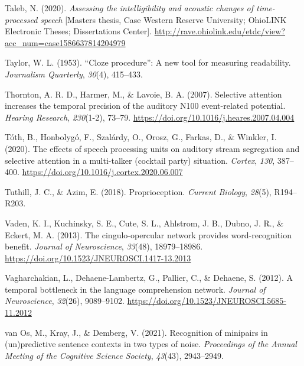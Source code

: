 \documentclass[a4paper, nobind]{templates/ociamthesis}
\newlength{\cslhangindent}
\newenvironment{CSLReferences}[2] %
 {%
  \setlength{\parindent}{0pt}
  \ifodd #1
  \let\oldpar\par
  \def\par{\hangindent=\cslhangindent\oldpar}
  \fi
  \setlength{\parskip}{1mm}
  \setlength{\baselineskip}{6mm}
 }%
 {}
\begin{document}
\begin{CSLReferences}{1}{0}
\leavevmode{}%
Taleb, N. (2020). \emph{Assessing the intelligibility and acoustic changes of time-processed speech} {[}Masters thesis, Case Western Reserve University; OhioLINK Electronic Theses; Dissertations Center{]}. \url{http://rave.ohiolink.edu/etdc/view?acc_num=case1586637814204979}

\leavevmode{}%
Taylor, W. L. (1953). {``Cloze procedure''}: A new tool for measuring readability. \emph{Journalism Quarterly}, \emph{30}(4), 415--433.

\leavevmode{}%
Thornton, A. R. D., Harmer, M., \& Lavoie, B. A. (2007). {Selective attention increases the temporal precision of the auditory N100 event-related potential}. \emph{Hearing Research}, \emph{230}(1-2), 73--79. \url{https://doi.org/10.1016/j.heares.2007.04.004}

\leavevmode{}%
Tóth, B., Honbolygó, F., Szalárdy, O., Orosz, G., Farkas, D., \& Winkler, I. (2020). {The effects of speech processing units on auditory stream segregation and selective attention in a multi-talker (cocktail party) situation}. \emph{Cortex}, \emph{130}, 387--400. \url{https://doi.org/10.1016/j.cortex.2020.06.007}

\leavevmode{}%
Tuthill, J. C., \& Azim, E. (2018). Proprioception. \emph{Current Biology}, \emph{28}(5), R194--R203.

\leavevmode{}%
Vaden, K. I., Kuchinsky, S. E., Cute, S. L., Ahlstrom, J. B., Dubno, J. R., \& Eckert, M. A. (2013). {The cingulo-opercular network provides word-recognition benefit}. \emph{Journal of Neuroscience}, \emph{33}(48), 18979--18986. \url{https://doi.org/10.1523/JNEUROSCI.1417-13.2013}

\leavevmode{}%
Vagharchakian, L., Dehaene-Lambertz, G., Pallier, C., \& Dehaene, S. (2012). {A temporal bottleneck in the language comprehension network}. \emph{Journal of Neuroscience}, \emph{32}(26), 9089--9102. \url{https://doi.org/10.1523/JNEUROSCI.5685-11.2012}

\leavevmode{}%
van Os, M., Kray, J., \& Demberg, V. (2021). {Recognition of minipairs in (un)predictive sentence contexts in two types of noise}. \emph{Proceedings of the Annual Meeting of the Cognitive Science Society}, \emph{43}(43), 2943--2949.


\end{CSLReferences}
\end{document}
